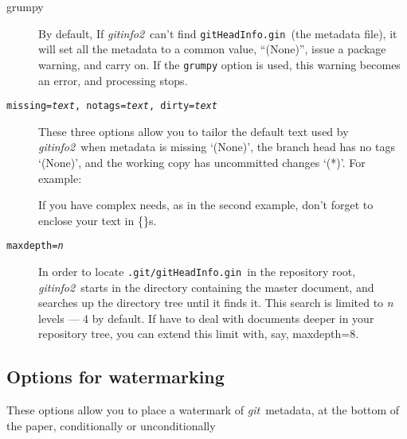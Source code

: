 \documentclass[a4paper,12pt,twoside,openany]{memoir}
\newcommand{\sfit}[1]{\textit{#1}}
\newcommand{\git}{\sfit{git}}
\newcommand{\tpname}{\sfit{gitinfo2}}
\newcommand{\ginname}{gitHeadInfo.gin}
\newcommand{\metaname}{\texttt{\ginname}}
\newcommand{\metapath}{\texttt{.git/\ginname}}
\begin{document}
\begin{description}

\item[grumpy]
By default, If \tpname\ can't find \metaname\ (the metadata file),
it will set all the metadata to a common value, ``(None)'',
issue a package warning, and carry on.
If the \texttt{grumpy} option is used,
this warning becomes an error, and processing stops.

\item[\texttt{missing=\textit{text}, notags=\textit{text}, dirty=\textit{text}}]
These three options allow you to tailor the default text used by \tpname\ when
metadata is missing `(None)',
the branch head has no tags `(None)',
and the working copy has uncommitted changes `(*)'.
For example:

\begin{quote}
{\ttfamily
[missing=Help!,notags=\{No\,tags?\},dirty=Eww!]
}
\end{quote}
If you have complex needs, as in the second example,
don't forget to enclose your text in \{\}s.

\item[\texttt{maxdepth=\textit{n}}]
In order to locate \metapath\ in the repository root,
\tpname\ starts in the directory containing the master document,
and searches up the directory tree until it finds it.
This search is limited to {\ttfamily\itshape n} levels --- 4 by default.
If have to deal with documents
deeper in your repository tree, you can extend this limit with, say,
{\ttfamily maxdepth=8}.

\end{description}
\clearpage
\subsection{Options for watermarking}

These options allow you to place a watermark of \git\ metadata,
at the bottom of the paper, conditionally or unconditionally
\end{document}
